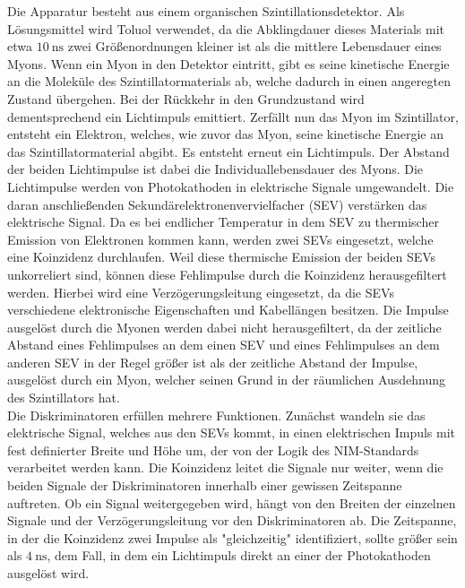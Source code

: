 Die Apparatur besteht aus einem organischen Szintillationsdetektor.
Als Lösungsmittel wird Toluol verwendet, da die Abklingdauer dieses Materials mit etwa $\SI{10}{\nano\second}$ zwei Größenordnungen kleiner ist als die mittlere Lebensdauer eines Myons.
Wenn ein Myon in den Detektor eintritt, gibt es seine kinetische Energie an die Moleküle des Szintillatormaterials ab, welche dadurch in einen angeregten Zustand übergehen.
Bei der Rückkehr in den Grundzustand wird dementsprechend ein Lichtimpuls emittiert.
Zerfällt nun das Myon im Szintillator, entsteht ein Elektron, welches, wie zuvor das Myon, seine kinetische Energie an das Szintillatormaterial abgibt.
Es entsteht erneut ein Lichtimpuls.
Der Abstand der beiden Lichtimpulse ist dabei die Individuallebensdauer des Myons.
Die Lichtimpulse werden von Photokathoden in elektrische Signale umgewandelt.
Die daran anschließenden Sekundärelektronenvervielfacher (SEV) verstärken das elektrische Signal.
Da es bei endlicher Temperatur in dem SEV zu thermischer Emission von Elektronen kommen kann, werden zwei SEVs eingesetzt, welche eine Koinzidenz durchlaufen.
Weil diese thermische Emission der beiden SEVs unkorreliert sind, können diese Fehlimpulse durch die Koinzidenz herausgefiltert werden.
Hierbei wird eine Verzögerungsleitung eingesetzt, da die SEVs verschiedene elektronische Eigenschaften und Kabellängen besitzen.
Die Impulse ausgelöst durch die Myonen werden dabei nicht herausgefiltert, da der zeitliche Abstand eines Fehlimpulses an dem einen SEV und eines Fehlimpulses an dem anderen SEV in der Regel größer ist als der zeitliche Abstand der Impulse, ausgelöst durch ein Myon, welcher seinen Grund in der räumlichen Ausdehnung des Szintillators hat.\\
Die Diskriminatoren erfüllen mehrere Funktionen.
Zunächst wandeln sie das elektrische Signal, welches aus den SEVs kommt, in einen elektrischen Impuls mit fest definierter Breite und Höhe um, der von der Logik des NIM-Standards verarbeitet werden kann.
Die Koinzidenz leitet die Signale nur weiter, wenn die beiden Signale der Diskriminatoren innerhalb einer gewissen Zeitspanne auftreten.
Ob ein Signal weitergegeben wird, hängt von den Breiten der einzelnen Signale und der Verzögerungsleitung vor den Diskriminatoren ab.
Die Zeitspanne, in der die Koinzidenz zwei Impulse als "gleichzeitig" identifiziert, sollte größer sein als $\SI{4}{\nano\second}$, dem Fall, in dem ein Lichtimpuls direkt an einer der Photokathoden ausgelöst wird.
